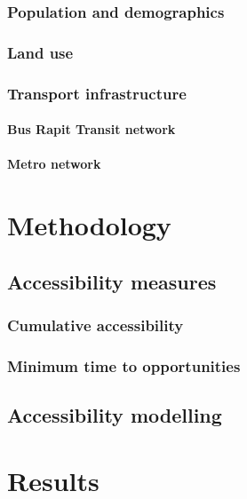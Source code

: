 \documentclass[12pt, a4paper]{report}
\begin{document}
\subsection{Population and demographics}

\subsection{Land use}

\subsection{Transport infrastructure}

\subsubsection{Bus Rapit Transit network}

\subsubsection{Metro network}



\chapter{Methodology} \label{Chap4}

\section{Accessibility measures}

\subsection{Cumulative accessibility}

\subsection{Minimum time to opportunities}

\section{Accessibility modelling}

\chapter{Results} \label{Chap5}
\end{document}
